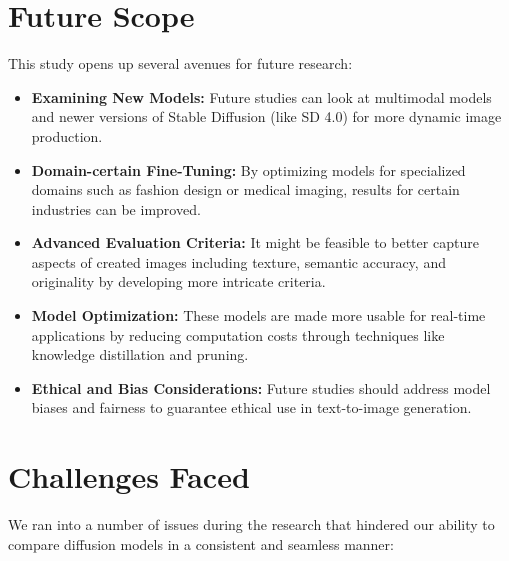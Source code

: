 \documentclass{article}
\begin{document}
\section{Future Scope}
This study opens up several avenues for future research:
\begin{itemize}
    \item \textbf{Examining New Models:} Future studies can look at multimodal models and newer versions of Stable Diffusion (like SD 4.0) for more dynamic image production.
    \item \textbf{Domain-certain Fine-Tuning:} By optimizing models for specialized domains such as fashion design or medical imaging, results for certain industries can be improved.
    \item \textbf{Advanced Evaluation Criteria:} It might be feasible to better capture aspects of created images including texture, semantic accuracy, and originality by developing more intricate criteria.
    \item \textbf{Model Optimization:} These models are made more usable for real-time applications by reducing computation costs through techniques like knowledge distillation and pruning.
    \item \textbf{Ethical and Bias Considerations:} Future studies should address model biases and fairness to guarantee ethical use in text-to-image generation.
\end{itemize}

\section{Challenges Faced}
We ran into a number of issues during the research that hindered our ability to compare diffusion models in a consistent and seamless manner:
\end{document}
